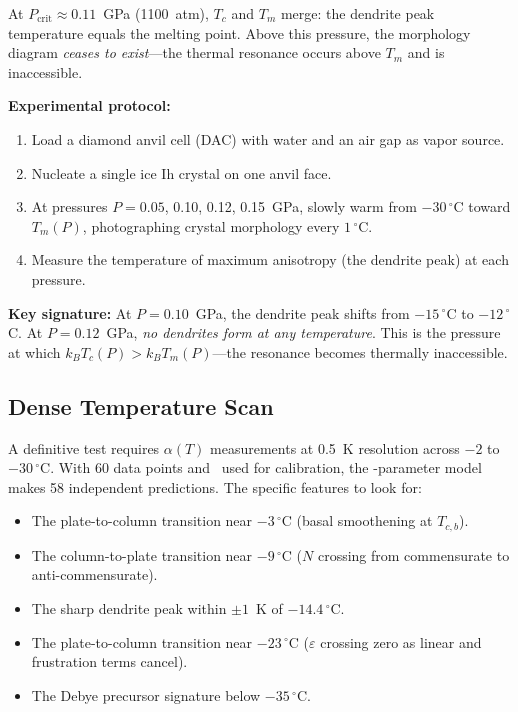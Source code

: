 \documentclass[12pt,letterpaper]{article}
\begin{document}
At $P_{\mathrm{crit}} \approx 0.11$~GPa (1100~atm), $T_c$ and $T_m$ merge: the dendrite peak temperature equals the melting point.  Above this pressure, the morphology diagram \emph{ceases to exist}---the thermal resonance occurs above $T_m$ and is inaccessible.

\textbf{Experimental protocol:}
\begin{enumerate}[nosep]
\item Load a diamond anvil cell (DAC) with water and an air gap as vapor source.
\item Nucleate a single ice Ih crystal on one anvil face.
\item At pressures $P = 0.05$, 0.10, 0.12, 0.15~GPa, slowly warm from $-30\,{}^\circ$C toward $T_m(P)$, photographing crystal morphology every $1\,{}^\circ$C.
\item Measure the temperature of maximum anisotropy (the dendrite peak) at each pressure.
\end{enumerate}

\textbf{Key signature:}  At $P = 0.10$~GPa, the dendrite peak shifts from $-15\,{}^\circ$C to $-12\,{}^\circ$C.  At $P = 0.12$~GPa, \emph{no dendrites form at any temperature}.  This is the pressure at which $k_BT_c(P) > k_BT_m(P)$---the resonance becomes thermally inaccessible.

\subsection{Dense Temperature Scan}

A definitive test requires $\alpha(T)$ measurements at 0.5~K resolution across $-2$ to $-30\,{}^\circ$C.  With 60 data points and \SnowCalibrationPoints\ used for calibration, the \SnowParameterCount-parameter model makes 58 independent predictions.  The specific features to look for:
\begin{itemize}[nosep]
\item The plate-to-column transition near $-3\,{}^\circ$C (basal smoothening at $T_{c,b}$).
\item The column-to-plate transition near $-9\,{}^\circ$C ($N$ crossing from commensurate to anti-commensurate).
\item The sharp dendrite peak within $\pm 1$~K of $-14.4\,{}^\circ$C.
\item The plate-to-column transition near $-23\,{}^\circ$C ($\varepsilon$ crossing zero as linear and frustration terms cancel).
\item The Debye precursor signature below $-35\,{}^\circ$C.
\end{itemize}
\end{document}

